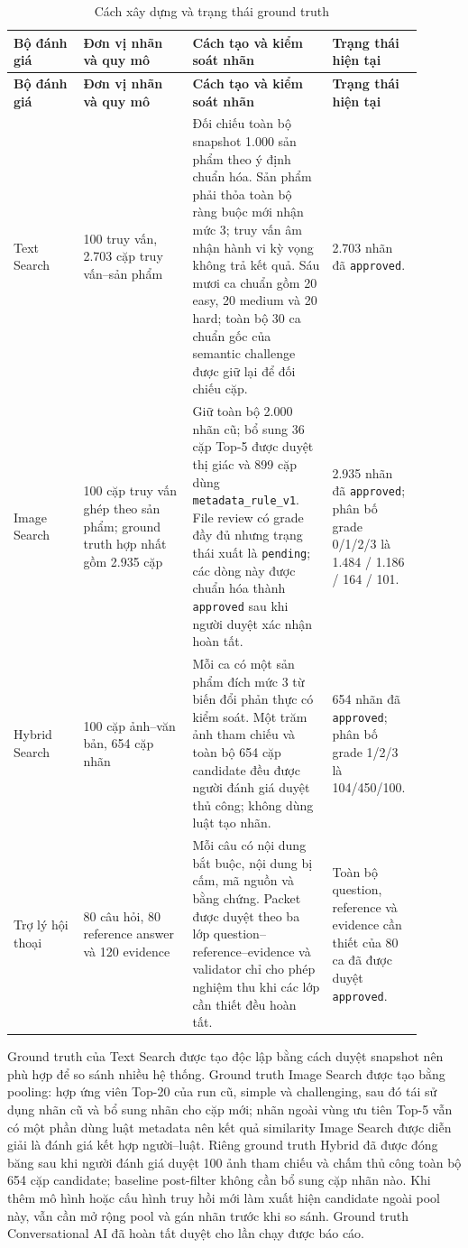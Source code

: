\begin{longtable}{|p{0.16\linewidth}|p{0.25\linewidth}|p{0.32\linewidth}|p{0.17\linewidth}|}
\caption{Cách xây dựng và trạng thái ground truth}\label{tab:ground-truth-construction}\\
\hline
\textbf{Bộ đánh giá} & \textbf{Đơn vị nhãn và quy mô} & \textbf{Cách tạo và kiểm soát nhãn} & \textbf{Trạng thái hiện tại} \\ \hline
\endfirsthead
\hline
\textbf{Bộ đánh giá} & \textbf{Đơn vị nhãn và quy mô} & \textbf{Cách tạo và kiểm soát nhãn} & \textbf{Trạng thái hiện tại} \\ \hline
\endhead
Text Search & 100 truy vấn, 2.703 cặp truy vấn--sản phẩm & Đối chiếu toàn bộ snapshot 1.000 sản phẩm theo ý định chuẩn hóa. Sản phẩm phải thỏa toàn bộ ràng buộc mới nhận mức 3; truy vấn âm nhận hành vi kỳ vọng không trả kết quả. Sáu mươi ca chuẩn gồm 20 easy, 20 medium và 20 hard; toàn bộ 30 ca chuẩn gốc của semantic challenge được giữ lại để đối chiếu cặp. & 2.703 nhãn đã \texttt{approved}. \\ \hline
Image Search & 100 cặp truy vấn ghép theo sản phẩm; ground truth hợp nhất gồm 2.935 cặp & Giữ toàn bộ 2.000 nhãn cũ; bổ sung 36 cặp Top-5 được duyệt thị giác và 899 cặp dùng \texttt{metadata\_rule\_v1}. File review có grade đầy đủ nhưng trạng thái xuất là \texttt{pending}; các dòng này được chuẩn hóa thành \texttt{approved} sau khi người duyệt xác nhận hoàn tất. & 2.935 nhãn đã \texttt{approved}; phân bố grade 0/1/2/3 là 1.484 / 1.186 / 164 / 101. \\ \hline
Hybrid Search & 100 cặp ảnh--văn bản, 654 cặp nhãn & Mỗi ca có một sản phẩm đích mức 3 từ biến đổi phản thực có kiểm soát. Một trăm ảnh tham chiếu và toàn bộ 654 cặp candidate đều được người đánh giá duyệt thủ công; không dùng luật tạo nhãn. & 654 nhãn đã \texttt{approved}; phân bố grade 1/2/3 là 104/450/100. \\ \hline
Trợ lý hội thoại & 80 câu hỏi, 80 reference answer và 120 evidence & Mỗi câu có nội dung bắt buộc, nội dung bị cấm, mã nguồn và bằng chứng. Packet được duyệt theo ba lớp question--reference--evidence và validator chỉ cho phép nghiệm thu khi các lớp cần thiết đều hoàn tất. & Toàn bộ question, reference và evidence cần thiết của 80 ca đã được duyệt \texttt{approved}. \\ \hline
\end{longtable}

Ground truth của Text Search được tạo độc lập bằng cách duyệt snapshot nên phù hợp để so sánh nhiều hệ thống. Ground truth Image Search được tạo bằng pooling: hợp ứng viên Top-20 của run cũ, simple và challenging, sau đó tái sử dụng nhãn cũ và bổ sung nhãn cho cặp mới; nhãn ngoài vùng ưu tiên Top-5 vẫn có một phần dùng luật metadata nên kết quả similarity Image Search được diễn giải là đánh giá kết hợp người--luật. Riêng ground truth Hybrid đã được đóng băng sau khi người đánh giá duyệt 100 ảnh tham chiếu và chấm thủ công toàn bộ 654 cặp candidate; baseline post-filter không cần bổ sung cặp nhãn nào. Khi thêm mô hình hoặc cấu hình truy hồi mới làm xuất hiện candidate ngoài pool này, vẫn cần mở rộng pool và gán nhãn trước khi so sánh. Ground truth Conversational AI đã hoàn tất duyệt cho lần chạy được báo cáo.


